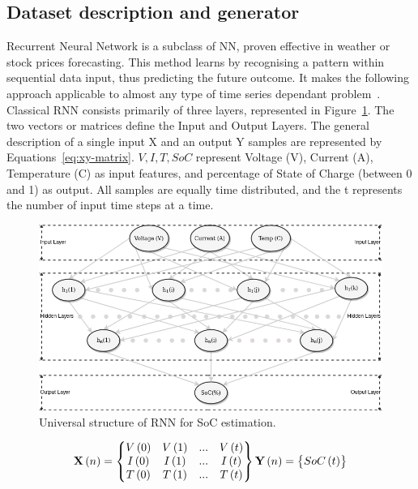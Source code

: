 \subsection{Dataset description and generator} \label{subsec:dataset}
Recurrent Neural Network is a subclass of NN, proven effective in weather or stock prices forecasting.
This method learns by recognising a pattern within sequential data input, thus predicting the future outcome.
It makes the following approach applicable to almost any type of time series dependant problem~\cite{anton_battery_2013}.
Classical RNN consists primarily of three layers, represented in \mbox{Figure~\ref{fig:RNN-structure}}.
The two vectors or matrices define the Input and Output Layers.
The general description of a single input X and an output Y samples are represented by \mbox{Equations~\ref{eq:xy-matrix}}.
$V, I, T, SoC$ represent Voltage (V), Current (A), Temperature (\textdegree{}C) as input features, and percentage of State of Charge (between 0 and 1) as output.
All samples are equally time distributed, and the t represents the number of input time steps at a time.
\begin{figure}[htbp]
    \centering
    \includegraphics[width=\columnwidth]{II_Body/images/SoC-RNN.png}
    \caption{Universal structure of RNN for SoC estimation.}
    \label{fig:RNN-structure}
\end{figure}
\begin{equation}
    \textbf{X} \left (n  \right ) = 
    \begin{Bmatrix}
        V \left (0  \right ) & V \left (1  \right ) & ... & V \left (t  \right )\\ 
        I \left (0  \right ) & I \left (1  \right ) & ... & I \left (t  \right )\\ 
        T \left (0  \right ) & T \left (1  \right ) & ... & T \left (t  \right )\\
    \end{Bmatrix}
    \\ \textbf{Y} \left (n  \right ) = 
    \begin{Bmatrix}
        SoC \left (t  \right ) 
    \end{Bmatrix}
\label{eq:xy-matrix}
\end{equation}

